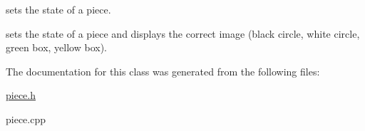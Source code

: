 sets the state of a piece. 

sets the state of a piece and displays the correct image (black circle, white circle, green box, yellow box). 

The documentation for this class was generated from the following files\+:\begin{DoxyCompactItemize}
\item 
\hyperlink{piece_8h}{piece.\+h}\item 
piece.\+cpp\end{DoxyCompactItemize}
